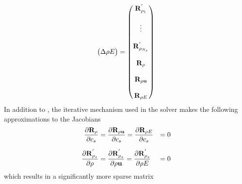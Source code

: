 \begin{equation}
\begin{pmatrix}
    \Delta \rho E
  \end{pmatrix}
  =
  \begin{pmatrix}
    \mathbf R_{\rho_1}^{'}     \\ \\
    \vdots               \\ \\
    \mathbf R_{\rho_{N_s}}^{'} \\ \\
    \mathbf R_{\rho}           \\ \\
    \mathbf R_{\rho \mathbf u}       \\ \\
    \mathbf R_{\rho E}
  \end{pmatrix}
  \label{dc-full-system}
\end{equation}
In addition to , the iterative mechanism used in the solver
makes the following approximations to the Jacobians
\begin{equation}
  \begin{aligned}
    \frac{\partial \mathbf R_{\rho}}{\partial c_s} &= \frac{\partial \mathbf R_{\rho \mathbf u}}{\partial c_s} = \frac{\partial \mathbf R_{\rho E}}{\partial c_s} &= 0 \\[6pt]
    \frac{\partial \mathbf R^{'}_{\rho_s}}{\partial \rho} &= \frac{\partial \mathbf R^{'}_{\rho_s}}{\partial \rho \mathbf u} = \frac{\partial \mathbf R^{'}_{\rho_s}}{\partial \rho E} &= 0
  \end{aligned}
  \label{dc-approximations}
\end{equation}
which results in a significantly more sparse matrix
